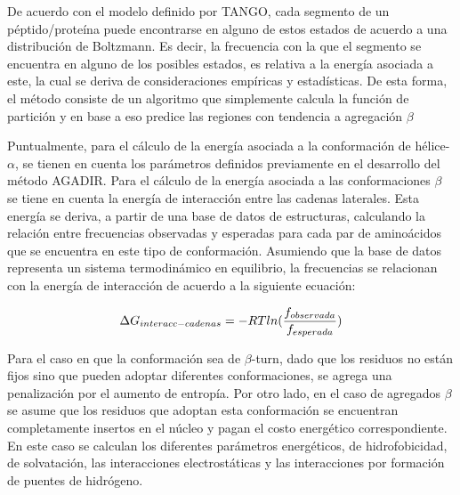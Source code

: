 De acuerdo con el modelo definido por TANGO, cada segmento de un péptido/proteína puede encontrarse en alguno de estos estados de acuerdo a una distribución de Boltzmann. 
Es decir, la frecuencia con la que el segmento se encuentra en alguno de los posibles estados, es relativa a la energía asociada a este, la cual se deriva de consideraciones empíricas y estadísticas. 
De esta forma, el método consiste de un algoritmo que simplemente calcula la función de partición y en base a eso predice las regiones con tendencia a agregación $\beta$

Puntualmente, para el cálculo de la energía asociada a la conformación de hélice-$\alpha$, se tienen en cuenta los parámetros definidos previamente en el desarrollo del método AGADIR\cite{lacroix1998elucidating}.
Para el cálculo de la energía asociada a las conformaciones $\beta$ se tiene en cuenta la energía de interacción entre las cadenas laterales.
Esta energía se deriva, a partir de una base de datos de estructuras, calculando la relación entre frecuencias observadas y esperadas para cada par de aminoácidos que se encuentra en este tipo de conformación.
Asumiendo que la base de datos representa un sistema termodinámico en equilibrio, la frecuencias se relacionan con la energía de interacción de acuerdo a la siguiente ecuación:

\begin{equation}
\large
 \Delta G_{interacc-cadenas}=-RTln(\frac{f_{observada}}{f_{esperada}})
\end{equation}


Para el caso en que la conformación sea de $\beta$-turn, dado que los residuos no están fijos sino que pueden adoptar diferentes conformaciones, se agrega una penalización por el aumento de entropía.
Por otro lado, en el caso de agregados $\beta$ se asume que los residuos que adoptan esta conformación se encuentran completamente insertos en el núcleo y pagan el costo energético correspondiente. 
En este caso se calculan los diferentes parámetros energéticos, de hidrofobicidad, de solvatación, las interacciones electrostáticas y las interacciones por formación de puentes de hidrógeno.

